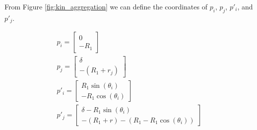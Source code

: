 \documentclass[conference]{IEEEtran}
\begin{document}
    From Figure \ref{fig:kin_aggregation} we can define the coordinates of $p_i$, $p_j$, $p'_i$, and $p'_j$.

    \begin{equation} \label{eq:two_kin_vars_1}
      \begin{split}
        p_i = \begin{bmatrix}0 \\ -R_1\end{bmatrix} \\
        p_j = \begin{bmatrix}\delta \\ -(R_1+r_j)\end{bmatrix} \\
        p'_i = \begin{bmatrix}R_1\sin(\theta_i) \\ -R_1\cos(\theta_i)\end{bmatrix} \\
        p'_j = \begin{bmatrix}\delta - R_1\sin(\theta_i) \\ -(R_1+r) - (R_1-R_1\cos(\theta_i))\end{bmatrix} \\
      \end{split}
    \end{equation}
\end{document}
